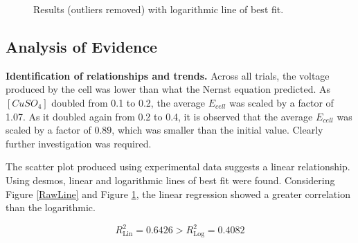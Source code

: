 \documentclass[11pt,a4paper]{article}
\begin{document}
\begin{figure}[h]

	\centering
	\caption{Results (outliers removed) with logarithmic line of best fit.}
	\label{RawLog}
\end{figure}


\subsection{Analysis of Evidence}
\textbf{Identification of relationships and trends.}\newline
Across all trials, the voltage produced by the cell was lower than what the Nernst equation predicted. As $[CuSO_4]$ doubled from 0.1 to 0.2, the average $E_{cell}$ was scaled by a factor of 1.07. As it doubled again from 0.2 to 0.4,  it is observed that the average $E_{cell}$  was scaled by a factor of $0.89$, which was smaller than the initial value. Clearly further investigation was required.


The scatter plot produced using experimental data suggests a linear relationship. Using desmos, linear and logarithmic lines of best fit were found. Considering Figure \ref{RawLine} and Figure \ref{RawLog}, the linear regression showed a greater correlation than the logarithmic.

$$R^2_\textrm{Lin}=0.6426>R^2_\textrm{Log}=0.4082$$
\end{document}
